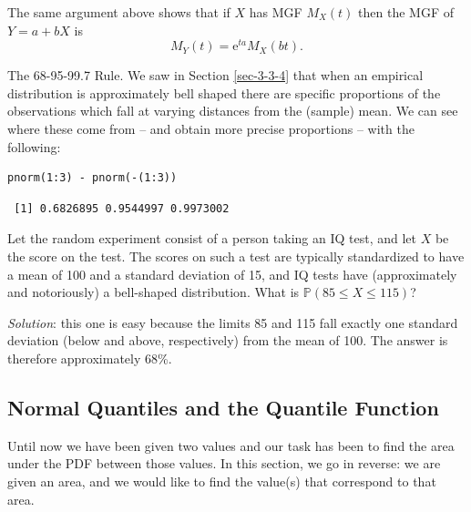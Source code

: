 \documentclass[captions=tableheading]{scrbook}
\begin{document}
\begin{fact}
The same argument above shows that if \(X\) has MGF \(M_{X}(t)\) then the MGF of \(Y=a+bX\) is
\begin{equation}
M_{Y}(t)=\mathrm{e}^{ta}M_{X}(bt).
\end{equation}
\end{fact}

\begin{example}
The 68-95-99.7 Rule. We saw in Section \ref{sec-3-3-4} that when an empirical distribution is approximately bell shaped there are specific proportions of the observations which fall at varying distances from the (sample) mean. We can see where these come from -- and obtain more precise proportions -- with the following:
\end{example}


\lstset{language=R}
\begin{lstlisting}
pnorm(1:3) - pnorm(-(1:3))
\end{lstlisting}

\begin{verbatim}
 [1] 0.6826895 0.9544997 0.9973002
\end{verbatim}

\begin{example}
Let the random experiment consist of a person taking an IQ test, and let \(X\) be the score on the test. The scores on such a test are typically standardized to have a mean of 100 and a standard deviation of 15, and IQ tests have (approximately and notoriously) a bell-shaped distribution. What is \(\mathbb{P}(85\leq X\leq115)\)?

\emph{Solution}: this one is easy because the limits 85 and 115 fall exactly one standard deviation (below and above, respectively) from the mean of 100. The answer is therefore approximately 68\%.
\end{example}
\subsection{Normal Quantiles and the Quantile Function}
\label{sec-6-3-1}
\label{sub-Normal-Quantiles-QF}


Until now we have been given two values and our task has been to find the area under the PDF between those values. In this section, we go in reverse: we are given an area, and we would like to find the value(s) that correspond to that area. 
\end{document}
